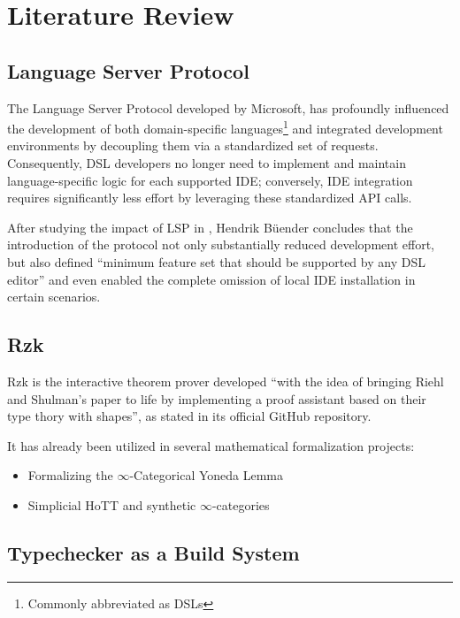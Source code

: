 \chapter{Literature Review}
\label{chap:lr}

\section{Language Server Protocol}
\label{lr:lsp}

The Language Server Protocol developed by Microsoft\cite{lspspecification},
has profoundly influenced the development of both domain-specific languages\footnote{Commonly abbreviated as DSLs}
and integrated development environments by decoupling them via a standardized set of requests.
Consequently, DSL developers no longer need to implement and maintain language-specific logic for each supported IDE;
conversely, IDE integration requires significantly less effort by leveraging these standardized API calls.

After studying the impact of LSP in \cite{lspimpact}, Hendrik B{\"u}ender concludes that
the introduction of the protocol not only substantially reduced development effort,
but also defined \enquote{minimum feature set that should be supported by any DSL editor}
and even enabled the complete omission of local IDE installation in certain scenarios.

\section{Rzk}
\label{lr:rzk}

Rzk is the interactive theorem prover developed \enquote{with the idea of bringing Riehl and Shulman's
paper\cite{riehl2023typetheorysyntheticinftycategories} to life by implementing a proof assistant
based on their type thory with shapes}, as stated in its official GitHub repository\cite{rzkcompilercodebase}.

It has already been utilized in several mathematical formalization projects:
\begin{itemize}
	\item Formalizing the $\infty$-Categorical Yoneda Lemma \cite{yonedalemma}
	\item Simplicial HoTT and synthetic $\infty$-categories \cite{shott}
\end{itemize}

\section{Typechecker as a Build System}
\label{lr:buildsys}

